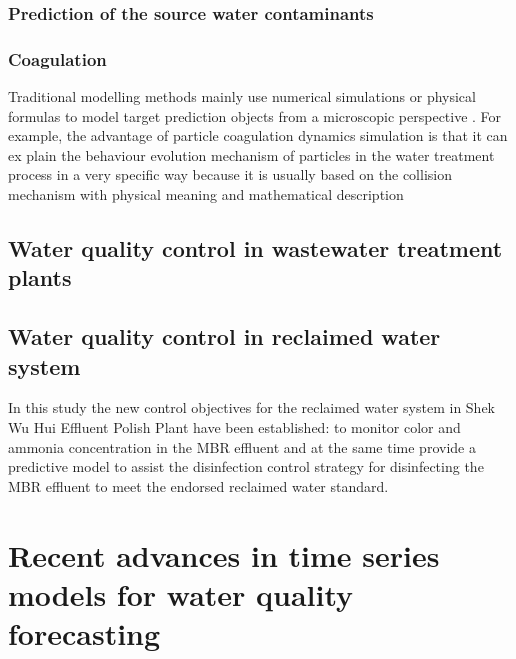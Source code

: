 \subsubsection{Prediction of the source water contaminants}
\subsubsection{Coagulation}
Traditional modelling methods 
mainly use numerical simulations or physical formulas to model target prediction objects from 
a microscopic perspective . For example, the advantage of particle coagulation dynamics 
simulation is that it can ex    plain the behaviour evolution mechanism of particles in the water 
treatment process in a very specific way because it is usually based on the collision mechanism 
with physical meaning and mathematical description

\subsection{Water quality control in wastewater treatment plants}
\subsection{Water quality control in reclaimed water system}

In this study the new control objectives for the reclaimed water system in 
Shek Wu Hui Effluent Polish Plant have been established: to monitor color 
and ammonia concentration in the MBR effluent and at the same time provide 
a predictive model to assist the disinfection control strategy for disinfecting 
the MBR effluent to meet the endorsed reclaimed water standard.

\section{Recent advances in time series models for water quality forecasting}
